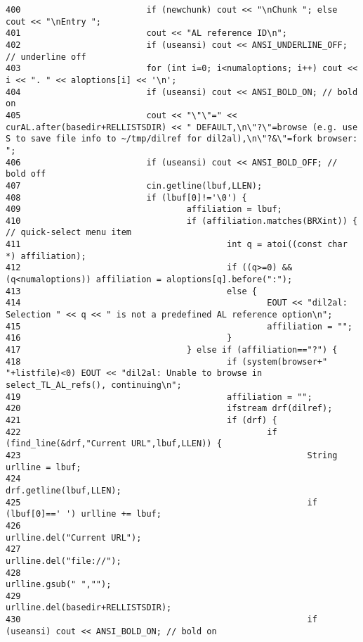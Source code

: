 \begin{verbatim}
400                         if (newchunk) cout << "\nChunk "; else cout << "\nEntry ";
401                         cout << "AL reference ID\n";
402                         if (useansi) cout << ANSI_UNDERLINE_OFF; // underline off
403                         for (int i=0; i<numaloptions; i++) cout << i << ". " << aloptions[i] << '\n';
404                         if (useansi) cout << ANSI_BOLD_ON; // bold on
405                         cout << "\"\"=" << curAL.after(basedir+RELLISTSDIR) << " DEFAULT,\n\"?\"=browse (e.g. use S to save file info to ~/tmp/dilref for dil2al),\n\"?&\"=fork browser: ";
406                         if (useansi) cout << ANSI_BOLD_OFF; // bold off
407                         cin.getline(lbuf,LLEN);
408                         if (lbuf[0]!='\0') {
409                                 affiliation = lbuf;
410                                 if (affiliation.matches(BRXint)) { // quick-select menu item
411                                         int q = atoi((const char *) affiliation);
412                                         if ((q>=0) && (q<numaloptions)) affiliation = aloptions[q].before(":");
413                                         else {
414                                                 EOUT << "dil2al: Selection " << q << " is not a predefined AL reference option\n";
415                                                 affiliation = "";
416                                         }
417                                 } else if (affiliation=="?") {
418                                         if (system(browser+" "+listfile)<0) EOUT << "dil2al: Unable to browse in select_TL_AL_refs(), continuing\n";
419                                         affiliation = "";
420                                         ifstream drf(dilref);
421                                         if (drf) {
422                                                 if (find_line(&drf,"Current URL",lbuf,LLEN)) {
423                                                         String urlline = lbuf;
424                                                         drf.getline(lbuf,LLEN);
425                                                         if (lbuf[0]==' ') urlline += lbuf;
426                                                         urlline.del("Current URL");
427                                                         urlline.del("file://");
428                                                         urlline.gsub(" ","");
429                                                         urlline.del(basedir+RELLISTSDIR);
430                                                         if (useansi) cout << ANSI_BOLD_ON; // bold on

\end{verbatim}
